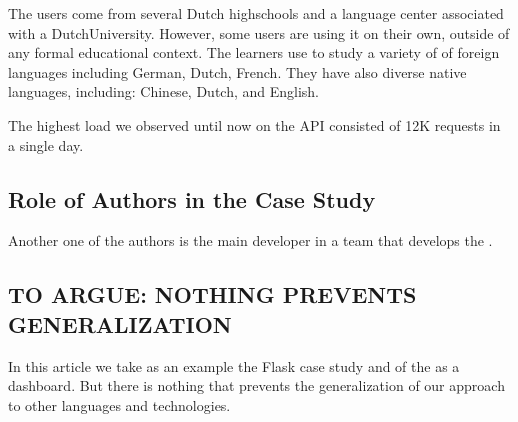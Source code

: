 The users come from several Dutch highschools and a language center associated with a DutchUniversity. However, some users are using it on their own, outside of any formal educational context. The learners use \zee to study a variety of of foreign languages including German, Dutch, French. They have also diverse native languages, including: Chinese, Dutch, and English. 

The highest load we observed until now on the API consisted of 12K requests in a single day. 

\subsection*{Role of Authors in the Case Study}

Another one of the authors is the main developer in a team 
that develops the \tool. 


\subsection*{TO ARGUE: NOTHING PREVENTS GENERALIZATION}
In this article we take as an example the Flask case study
and of the \tool as a dashboard. 
But there is nothing that prevents the generalization of 
our approach to other languages and technologies.




